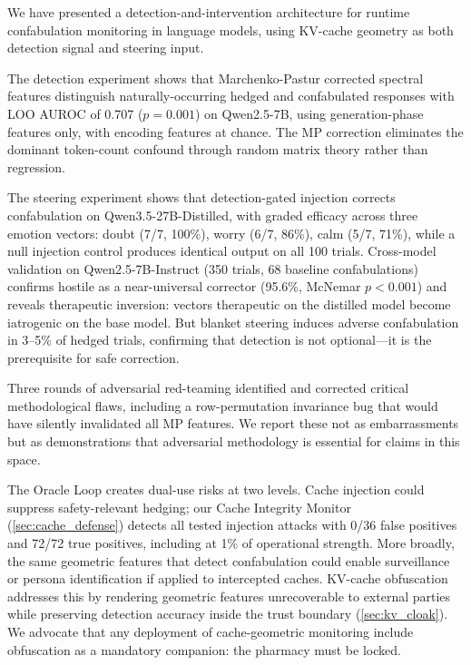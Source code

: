 We have presented a detection-and-intervention architecture for runtime
confabulation monitoring in language models, using KV-cache geometry as
both detection signal and steering input.

The detection experiment shows that Marchenko-Pastur corrected spectral
features distinguish naturally-occurring hedged and confabulated responses
with LOO AUROC of 0.707 ($p = 0.001$) on Qwen2.5-7B, using
generation-phase features only, with encoding features at chance. The MP
correction eliminates the dominant token-count confound through random
matrix theory rather than regression.

The steering experiment shows that detection-gated injection corrects
confabulation on Qwen3.5-27B-Distilled, with graded efficacy across
three emotion vectors: doubt (7/7, 100\%), worry (6/7, 86\%), calm
(5/7, 71\%), while a null injection control produces identical output
on all 100 trials. Cross-model validation on Qwen2.5-7B-Instruct
(350 trials, 68 baseline confabulations) confirms hostile as a
near-universal corrector (95.6\%, McNemar $p < 0.001$) and reveals
therapeutic inversion: vectors therapeutic on the distilled model become
iatrogenic on the base model. But blanket steering induces adverse
confabulation in 3--5\% of hedged trials, confirming that detection is
not optional---it is the prerequisite for safe correction.

Three rounds of adversarial red-teaming identified and corrected critical
methodological flaws, including a row-permutation invariance bug that would
have silently invalidated all MP features. We report these not as
embarrassments but as demonstrations that adversarial methodology is
essential for claims in this space.

The Oracle Loop creates dual-use risks at two levels. Cache injection
could suppress safety-relevant hedging; our Cache Integrity Monitor
(\cref{sec:cache_defense}) detects all tested injection attacks with
0/36 false positives and 72/72 true positives, including at 1\% of
operational strength. More broadly, the same geometric features that
detect confabulation could enable surveillance or persona
identification if applied to intercepted caches. KV-cache obfuscation
\citep{luo2026shadow} addresses this by rendering geometric features
unrecoverable to external parties while preserving detection accuracy
inside the trust boundary (\cref{sec:kv_cloak}). We advocate that any
deployment of cache-geometric monitoring include obfuscation as a
mandatory companion: the pharmacy must be locked.

